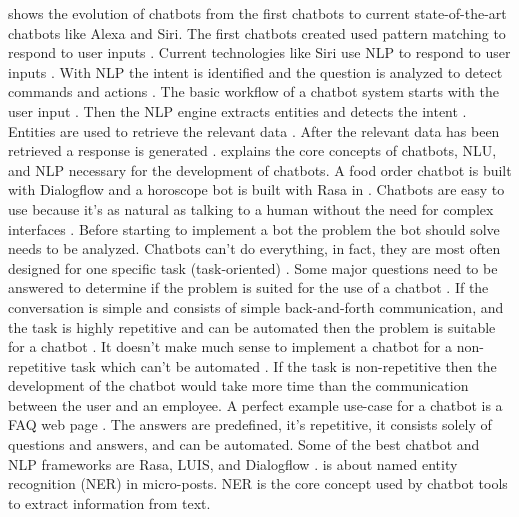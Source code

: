 \citet{deshpande2017survey} shows the evolution of chatbots from the first chatbots to 
current state-of-the-art chatbots like Alexa and Siri.
The first chatbots created used pattern matching to respond to user inputs \cite{deshpande2017survey}.
Current technologies like Siri use NLP to respond to user inputs \cite{deshpande2017survey}.
With NLP the intent is identified and the question is analyzed to detect commands and actions \cite{deshpande2017survey}.
The basic workflow of a chatbot system starts with the user input \cite{deshpande2017survey}. 
Then the NLP engine extracts entities and detects the intent \cite{deshpande2017survey}.
Entities are used to retrieve the relevant data \cite{deshpande2017survey}.
After the relevant data has been retrieved a response is generated \cite{deshpande2017survey}.
\citet{buiildChatbotsPython} explains the core concepts of chatbots, NLU, and NLP necessary for the development of chatbots.
A food order chatbot is built with Dialogflow and a horoscope bot is built with Rasa in \citet{buiildChatbotsPython}.
Chatbots are easy to use because it's as natural as talking to a human without the need for complex interfaces \cite{buiildChatbotsPython}.
Before starting to implement a bot the problem the bot should solve needs to be analyzed.
Chatbots can't do everything, in fact, they are most often designed for one specific task (task-oriented) \cite{buiildChatbotsPython}.
Some major questions need to be answered to determine if the problem is suited for the use of a chatbot \cite{buiildChatbotsPython}.
If the conversation is simple and consists of simple back-and-forth communication, and the task is highly repetitive and can be automated then the problem is suitable for a chatbot \cite{buiildChatbotsPython}.
It doesn't make much sense to implement a chatbot for a non-repetitive task which can't be automated \cite{buiildChatbotsPython}.
If the task is non-repetitive then the development of the chatbot would take more time than the communication between the user and an employee.
A perfect example use-case for a chatbot is a FAQ web page \cite{buiildChatbotsPython}.
The answers are predefined, it's repetitive, it consists solely of questions and answers, and can be automated.
Some of the best chatbot and NLP frameworks are Rasa, LUIS, and Dialogflow \cite{buiildChatbotsPython}.
\citet{geyer2016named} is about named entity recognition (NER) in micro-posts.
NER is the core concept used by chatbot tools to extract information from text.
